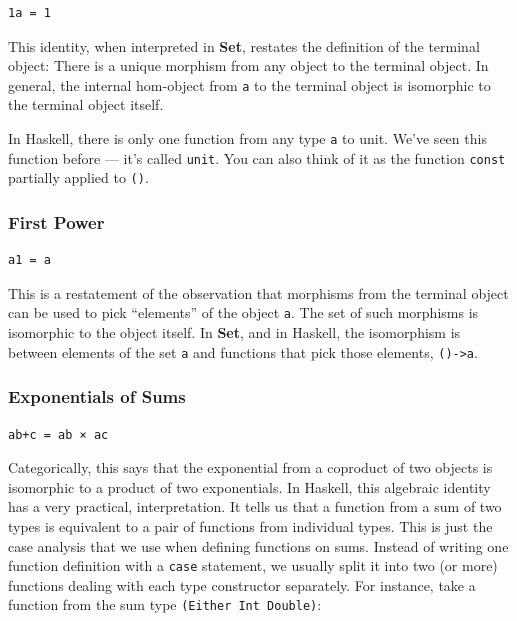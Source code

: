\begin{verbatim}
1a = 1
\end{verbatim}

This identity, when interpreted in \textbf{Set}, restates the definition
of the terminal object: There is a unique morphism from any object to
the terminal object. In general, the internal hom-object from \texttt{a}
to the terminal object is isomorphic to the terminal object itself.

In Haskell, there is only one function from any type \texttt{a} to unit.
We've seen this function before --- it's called \texttt{unit}. You can
also think of it as the function \texttt{const} partially applied to
\texttt{()}.

\subsubsection{First Power}\label{first-power}

\begin{verbatim}
a1 = a
\end{verbatim}

This is a restatement of the observation that morphisms from the
terminal object can be used to pick ``elements'' of the object
\texttt{a}. The set of such morphisms is isomorphic to the object
itself. In \textbf{Set}, and in Haskell, the isomorphism is between
elements of the set \texttt{a} and functions that pick those elements,
\texttt{()-\textgreater{}a}.

\subsubsection{Exponentials of Sums}\label{exponentials-of-sums}

\begin{verbatim}
ab+c = ab × ac
\end{verbatim}

Categorically, this says that the exponential from a coproduct of two
objects is isomorphic to a product of two exponentials. In Haskell, this
algebraic identity has a very practical, interpretation. It tells us
that a function from a sum of two types is equivalent to a pair of
functions from individual types. This is just the case analysis that we
use when defining functions on sums. Instead of writing one function
definition with a \texttt{case} statement, we usually split it into two
(or more) functions dealing with each type constructor separately. For
instance, take a function from the sum type
\texttt{(Either\ Int\ Double)}:

